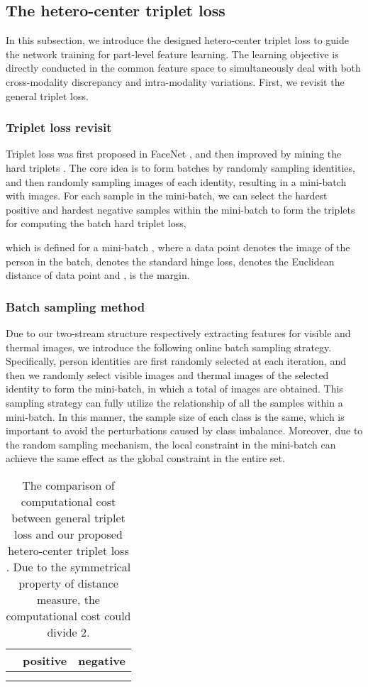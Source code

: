\documentclass[journal]{IEEEtran}
\begin{document}
\subsection{The hetero-center triplet loss}
In this subsection, we introduce the designed hetero-center triplet loss to guide the network training for part-level feature learning. The learning objective is directly conducted in the common feature space to simultaneously deal with both cross-modality discrepancy and intra-modality variations.
First, we revisit the general triplet loss.

\subsubsection{Triplet loss revisit}
Triplet loss was first proposed in FaceNet \cite{schroff2015facenet}, and then improved by mining the hard triplets \cite{hermans2017defense}. The core idea is to form batches by randomly sampling  identities, and then randomly sampling  images of each identity, resulting in a mini-batch with  images. For each sample  in the mini-batch, we can select the hardest positive and hardest negative samples within the mini-batch to form the triplets for computing the batch hard triplet loss,

which is defined for a mini-batch , where a data point  denotes the  image of the  person in the batch,  denotes the standard hinge loss,  denotes the Euclidean distance of data point  and ,  is the margin.

\subsubsection{Batch sampling method} Due to our two-stream structure respectively extracting features for visible and thermal images, we introduce the following online batch sampling strategy. Specifically,  person identities are first randomly selected at each iteration, and then we randomly select  visible images and  thermal images of the selected identity to form the mini-batch, in which a total of  images are obtained. This sampling strategy can fully utilize the relationship of all the samples within a mini-batch. In this manner, the sample size of each class is the same, which is important to avoid the perturbations caused by class imbalance. Moreover, due to the random sampling mechanism, the local constraint in the mini-batch can achieve the same effect as the global constraint in the entire set.

\begin{table}
  \centering
  \caption{The comparison of computational cost between general triplet loss  and our proposed hetero-center triplet loss . Due to the symmetrical property of distance measure, the computational cost could divide 2. }\label{tab:cost_com}
  \begin{tabular}{l|c|c}
  \toprule[2pt]
     & positive   & negative  \\ \toprule[1pt]
    &          &          \\ \hline
    &                 &           \\ \toprule[2pt]
  \end{tabular}
\end{table}
\end{document}
